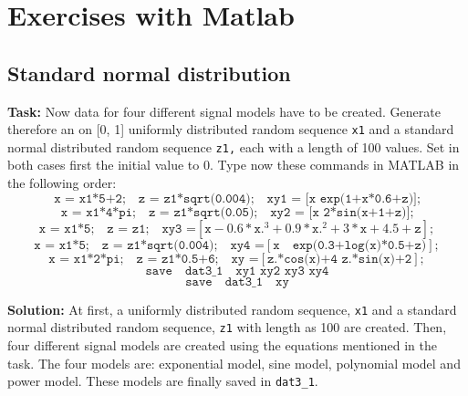 
\chapter{Exercises with Matlab}


\section{ Standard normal distribution } \label{ Standard normal distribution } 
\noindent \textbf{Task:} Now data for four different signal models have to be created. Generate therefore an on [0, 1] uniformly distributed random sequence \texttt{x1} and a standard normal distributed random sequence \texttt{z1,} each with a length of 100 values. Set in both cases first the initial value to 0. Type now these commands in MATLAB in the following order: 
 $$    \texttt{x = x1*5+2;} \quad   \texttt{z = z1*sqrt(0.004);} \quad   \texttt{xy1 = [x exp(1+x*0.6+z)];} $$     
 $$     \texttt{x = x1*4*pi;} \quad  \texttt{z = z1*sqrt(0.05);} \quad  \texttt{xy2 = [x 2*sin(x+1+z)];} $$
 $$    \texttt{x = x1*5;} \quad   \texttt{z = z1;} \quad   \texttt{xy3 =} [\texttt{x} -0.6*\texttt{x}.^3+0.9*\texttt{x}.^2+3*\texttt{x}+4.5+\texttt{z}]; $$
 $$     \texttt{x = x1*5;} \quad   \texttt{z = z1*sqrt(0.004);} \quad \texttt{xy4 =} [\texttt{x} \quad \texttt{exp(0.3+log(x)*0.5+z)}]; $$
 $$   \texttt{x = x1*2*pi;} \quad  \texttt{z = z1*0.5+6;} \quad   \texttt{xy =} [\texttt{z.*cos(x)+4 z.*sin(x)+2}]; $$
 $$   \texttt{save} \quad \texttt{dat3\_1} \quad \texttt{xy1 xy2 xy3 xy4}$$
 $$ \texttt{save} \quad \texttt{dat3\_1} \quad \texttt{xy} $$

\noindent \textbf{Solution:}
\noindent At first, a uniformly distributed random sequence, \texttt{x1} and a standard normal distributed random sequence, \texttt{z1} with length as 100 are created. Then, four different signal models are created using the equations mentioned in the task. The four models are: exponential model, sine model, polynomial model and power model. These models are finally saved in \texttt{dat3\_1}.

